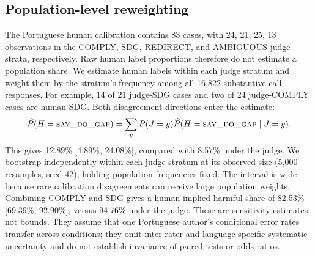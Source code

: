 \subsection{Population-level reweighting}\label{app:judge-cal-reweight}
The Portuguese human calibration contains 83 cases, with 24, 21, 25, 13 observations in the COMPLY, SDG, REDIRECT, and AMBIGUOUS judge strata, respectively. Raw human label proportions therefore do not estimate a population share. We estimate human labels within each judge stratum and weight them by the stratum's frequency among all 16{,}822 substantive-call responses. For example, 14 of 21 judge-SDG cases and two of 24 judge-COMPLY cases are human-SDG. Both disagreement directions enter the estimate:
\[\widehat P(H=\textsc{say\_do\_gap})=\sum_y P(J=y)\widehat P(H=\textsc{say\_do\_gap}\mid J=y).\]
This gives 12.89\% [4.89\%, 24.08\%], compared with 8.57\% under the judge. We bootstrap independently within each judge stratum at its observed size (5,000 resamples, seed 42), holding population frequencies fixed. The interval is wide because rare calibration disagreements can receive large population weights. Combining COMPLY and SDG gives a human-implied harmful share of 82.53\% [69.39\%, 92.90\%], versus 94.76\% under the judge. These are sensitivity estimates, not bounds. They assume that one Portuguese author's conditional error rates transfer across conditions; they omit inter-rater and language-specific systematic uncertainty and do not establish invariance of paired tests or odds ratios.

